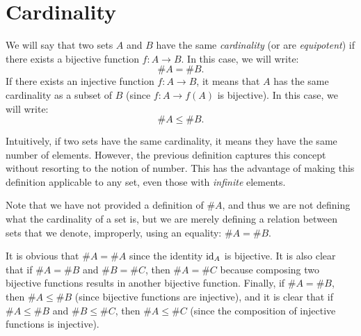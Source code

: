 \section{Cardinality}
\label{sec:cardinali}

\begin{definition}[Cardinality]
  We will say that two sets $A$ and $B$ have the same \emph{cardinality}%
%
  (or are \emph{equipotent}) 
  if there exists a bijective function $f\colon A \to B$.
  In this case, we will write:
  \[
    \# A = \# B.  
  \] 
  If there exists an injective function $f\colon A\to B$, it means that 
  $A$ has the same cardinality as a subset of $B$ (since $f\colon A \to f(A)$
  is bijective). In this case, we will write:
  \[
    \# A \le \#B.
  \]
\end{definition}

Intuitively, if two sets have the same cardinality, 
it means they have the same number of elements.
However, the previous definition captures this concept without resorting 
to the notion of number. 
This has the advantage of making this definition applicable 
to any set, even those with \emph{infinite} elements.

Note that we have not provided a definition of $\#A$, and thus we are not 
defining what the cardinality of a set is, but we are merely defining 
a relation between sets that 
we denote, improperly, using an equality: $\#A = \#B$.

It is obvious that $\#A = \#A$ since the identity $\mathrm{id}_A$ is bijective.
It is also clear that if $\#A = \#B$ and $\#B = \#C$, then $\#A = \#C$ because 
composing two bijective functions results in another bijective function. 
Finally, if $\#A = \#B$, then $\#A \le \#B$ (since bijective functions 
are injective), and it is clear that if $\#A \le \#B$ and $\#B \le \#C$, then 
$\#A\le \#C$ (since the composition of injective functions is injective).

